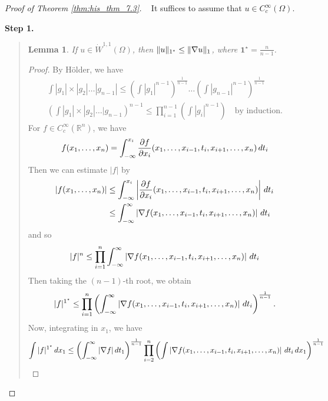 \documentclass[10pt, oneside, reqno]{amsart}
\theoremstyle{plain}%
\newtheorem{lem}[thm]{Lemma}
\numberwithin{equation}{section}
\theoremstyle{definition}
\theoremstyle{remark}
\newcommand{\R}{\mathbb{R}}
\begin{document}
\begin{proof}[Proof of Theorem \ref{thm:his_thm_7.3}]{\ }
    It suffices to assume that $u \in C^\infty_c(\Omega)$.
    
    \textbf{Step 1.} 
    \begin{quote}
    \begin{lem}
        If $u \in \dot W^{1, 1}(\Omega)$, then $\| u \|_{1^\star} \leq \| \nabla u \|_{1}$, where $\mathbf{1}^\star = \frac{n}{n-1}$.
    \end{lem}
    
    \begin{proof}
        By H\"older, we have \begin{align*}
            \int |g_1| \times |g_2| \dots  |g_{n-1}| \leq \left( \int |g_1|^{n-1}\right)^{\frac{1}{n-1}} \dots \left( \int |g_{n-1}|^{n-1} \right)^{\frac{1}{n-1}} \\
            \left( \int |g_1| \times |g_2| \dots |g_{n-1} \right)^{n-1} \leq \prod_{i=1}^{n-1} \left( \int |g_i|^{n-1} \right) \quad \text{by induction.}
        \end{align*}
        For $f \in C^{\infty}_c(\R^n)$, we have \[
            f(x_1, \dots, x_n) = \int_{-\infty}^{x_i} \frac{\partial f}{\partial x_i}(x_1, \dots, x_{i-1}, t_i, x_{i+1}, \dots, x_n) \, dt_i
        \]  Then we can estimate $|f|$ by \begin{align*}
            |f(x_1, \dots, x_n)| &\leq \int_{-\infty}^{x_i} \left| \frac{\partial f}{\partial x_i}(x_1, \dots, x_{i-1}, t_i, x_{i+1}, \dots, x_n) \right| \, dt_i \\
            &\leq \int_{-\infty}^{\infty} \left| \nabla f (x_1, \dots, x_{i-1}, t_i, x_{i+1}, \dots, x_n) \right| \, dt_i
        \end{align*} and so \[
            |f|^n \leq \prod_{i=1}^n \int_{-\infty}^{\infty} \left| \nabla f (x_1, \dots, x_{i-1}, t_i, x_{i+1}, \dots, x_n) \right| \, dt_i
        \]  Then taking the $(n-1)$-th root, we obtain \begin{align*}
            |f|^{1^\star} \leq \prod_{i=1}^n \left( \int_{-\infty}^{\infty} \left| \nabla f (x_1, \dots, x_{i-1}, t_i, x_{i+1}, \dots, x_n) \right| \, dt_i \right)^{\frac{1}{n-1}}.
        \end{align*}  Now, integrating in $x_1$, we have \begin{align*}
            \int |f|^{1^\star} \, dx_1 \leq \left( \int_{-\infty}^{\infty} |\nabla f | \, dt_1 \right)^{\frac{1}{n-1}} \prod_{i=2}^n \left(\int \left|\nabla f(x_1, \dots, x_{i-1}, t_i, x_{i+1}, \dots, x_n) \right| \, dt_i \, dx_1 \right)^{\frac{1}{n-1}}
        \end{align*} 
        

\end{proof}
\end{quote}
\end{proof}
\end{document}
